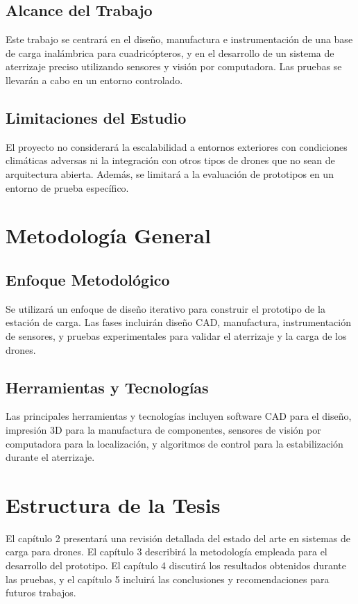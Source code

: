 \subsection{Alcance del Trabajo}

Este trabajo se centrará en el diseño, manufactura e instrumentación de una base de carga inalámbrica para cuadricópteros, y en el desarrollo de un sistema de aterrizaje preciso utilizando sensores y visión por computadora. Las pruebas se llevarán a cabo en un entorno controlado.

\subsection{Limitaciones del Estudio}

El proyecto no considerará la escalabilidad a entornos exteriores con condiciones climáticas adversas ni la integración con otros tipos de drones que no sean de arquitectura abierta. Además, se limitará a la evaluación de prototipos en un entorno de prueba específico.

\section{Metodología General}

\subsection{Enfoque Metodológico}

Se utilizará un enfoque de diseño iterativo para construir el prototipo de la estación de carga. Las fases incluirán diseño CAD, manufactura, instrumentación de sensores, y pruebas experimentales para validar el aterrizaje y la carga de los drones.

\subsection{Herramientas y Tecnologías}

Las principales herramientas y tecnologías incluyen software CAD para el diseño, impresión 3D para la manufactura de componentes, sensores de visión por computadora para la localización, y algoritmos de control para la estabilización durante el aterrizaje.

\section{Estructura de la Tesis}

El capítulo 2 presentará una revisión detallada del estado del arte en sistemas de carga para drones. El capítulo 3 describirá la metodología empleada para el desarrollo del prototipo. El capítulo 4 discutirá los resultados obtenidos durante las pruebas, y el capítulo 5 incluirá las conclusiones y recomendaciones para futuros trabajos.

